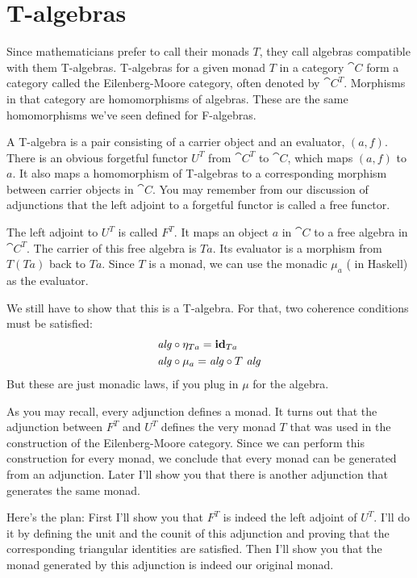 \section{T-algebras}

Since mathematicians prefer to call their monads $T$, they call
algebras compatible with them T-algebras. T-algebras for a given monad $T$
in a category $\cat{C}$ form a category called the Eilenberg-Moore
category, often denoted by $\cat{C}^T$. Morphisms in that
category are homomorphisms of algebras. These are the same homomorphisms
we've seen defined for F-algebras.

A T-algebra is a pair consisting of a carrier object and an evaluator,
$(a, f)$. There is an obvious forgetful functor $U^T$ from
$\cat{C}^T$ to $\cat{C}$, which maps $(a, f)$ to $a$. It
also maps a homomorphism of T-algebras to a corresponding morphism
between carrier objects in $\cat{C}$. You may remember from our discussion of
adjunctions that the left adjoint to a forgetful functor is called a
free functor.

The left adjoint to $U^T$ is called $F^T$. It maps an object
$a$ in $\cat{C}$ to a free algebra in $\cat{C}^T$. The carrier
of this free algebra is $T a$. Its evaluator is a morphism from
$T (T a)$ back to $T a$. Since $T$ is a monad,
we can use the monadic $\mu_a$ ( in Haskell) as the
evaluator.

We still have to show that this is a T-algebra. For that, two coherence
conditions must be satisfied:
\begin{align*}
  \mathit{alg} & \circ \eta_{Ta} = \mathbf{id}_{Ta}     \\
  \mathit{alg} & \circ \mu_a = \mathit{alg} \circ T\ \mathit{alg}
\end{align*}
But these are just monadic laws, if you plug in $\mu$ for the
algebra.

As you may recall, every adjunction defines a monad. It turns out that
the adjunction between $F^T$ and $U^T$
defines the very monad $T$ that was used in the construction of
the Eilenberg-Moore category. Since we can perform this construction for
every monad, we conclude that every monad can be generated from an
adjunction. Later I'll show you that there is another adjunction that
generates the same monad.

Here's the plan: First I'll show you that $F^T$ is indeed the left
adjoint of $U^T$. I'll do it by defining the unit and the counit
of this adjunction and proving that the corresponding triangular
identities are satisfied. Then I'll show you that the monad generated by
this adjunction is indeed our original monad.

